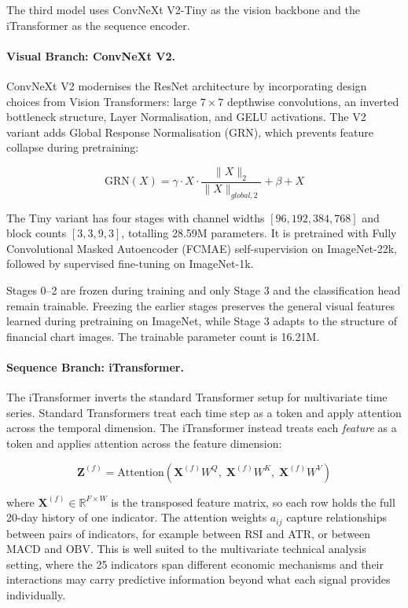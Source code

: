 The third model uses ConvNeXt V2-Tiny \parencite{woo2023} as the vision backbone and the iTransformer \parencite{liu2024itransformer} as the sequence encoder.

\paragraph{Visual Branch: ConvNeXt V2.}
ConvNeXt V2 modernises the ResNet architecture by incorporating design choices from Vision Transformers: large $7 \times 7$ depthwise convolutions, an inverted bottleneck structure, Layer Normalisation, and GELU activations. The V2 variant adds Global Response Normalisation (GRN), which prevents feature collapse during pretraining:

\begin{equation}
\text{GRN}(X) = \gamma \cdot X \cdot \frac{\|X\|_2}{\|X\|_{global,2}} + \beta + X
\label{eq:grn}
\end{equation}

The Tiny variant has four stages with channel widths $[96, 192, 384, 768]$ and block counts $[3, 3, 9, 3]$, totalling 28.59M parameters. It is pretrained with Fully Convolutional Masked Autoencoder (FCMAE) self-supervision on ImageNet-22k, followed by supervised fine-tuning on ImageNet-1k.

Stages 0--2 are frozen during training and only Stage 3 and the classification head remain trainable. Freezing the earlier stages preserves the general visual features learned during pretraining on ImageNet, while Stage 3 adapts to the structure of financial chart images. The trainable parameter count is 16.21M.

\paragraph{Sequence Branch: iTransformer.}
The iTransformer \parencite{liu2024itransformer} inverts the standard Transformer setup for multivariate time series. Standard Transformers treat each time step as a token and apply attention across the temporal dimension. The iTransformer instead treats each \textit{feature} as a token and applies attention across the feature dimension:

\begin{equation}
\mathbf{Z}^{(f)} = \text{Attention}\!\left(\mathbf{X}^{(f)} W^Q,\; \mathbf{X}^{(f)} W^K,\; \mathbf{X}^{(f)} W^V\right)
\label{eq:itransformer}
\end{equation}

where $\mathbf{X}^{(f)} \in \mathbb{R}^{F \times W}$ is the transposed feature matrix, so each row holds the full 20-day history of one indicator. The attention weights $a_{ij}$ capture relationships between pairs of indicators, for example between RSI and ATR, or between MACD and OBV. This is well suited to the multivariate technical analysis setting, where the 25 indicators span different economic mechanisms and their interactions may carry predictive information beyond what each signal provides individually.

